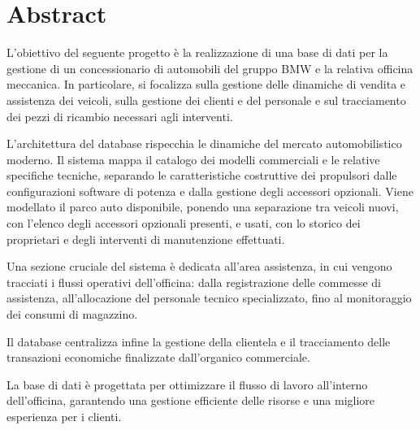 \section{Abstract}

L'obiettivo del seguente progetto è la realizzazione di una base di dati per la gestione di
un concessionario di automobili del gruppo BMW e la relativa officina meccanica.
In particolare, si focalizza sulla gestione delle dinamiche di vendita e assistenza dei
veicoli, sulla gestione dei clienti e del personale e sul tracciamento
dei pezzi di ricambio necessari agli interventi.

L'architettura del database rispecchia le dinamiche del mercato automobilistico moderno.
Il sistema mappa il catalogo dei modelli commerciali e le relative specifiche tecniche,
separando le caratteristiche costruttive dei propulsori dalle configurazioni software di 
potenza e dalla gestione degli accessori opzionali. Viene modellato il parco auto
disponibile, ponendo una separazione tra veicoli nuovi, con l'elenco degli accessori 
opzionali presenti, e usati, con lo storico dei proprietari e degli interventi di
manutenzione effettuati.

Una sezione cruciale del sistema è dedicata all'area assistenza, in cui vengono tracciati 
i flussi operativi dell'officina: dalla registrazione delle commesse di assistenza,
all'allocazione del personale tecnico specializzato, fino al monitoraggio
dei consumi di magazzino.

Il database centralizza infine la gestione della clientela e il tracciamento delle
transazioni economiche finalizzate dall'organico commerciale.

La base di dati è progettata per ottimizzare il flusso di lavoro all'interno
dell'officina, garantendo una gestione efficiente delle risorse e una migliore esperienza 
per i clienti.